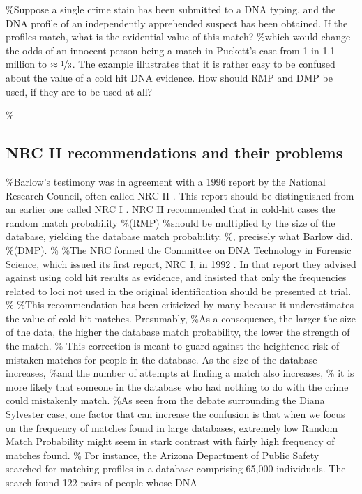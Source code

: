 \documentclass[10pt,dvipsnames,enabledeprecatedfontcommands]{scrartcl}
\begin{document}
\%Suppose a single crime stain has been submitted to a DNA typing, and
the DNA profile of an independently apprehended suspect has been
obtained. If the profiles match, what is the evidential value of this
match? \%which would change the odds of an innocent person being a match
in Puckett's case from 1 in 1.1 million to \(\approx \nicefrac{1}{3}\).
The example illustrates that it is rather easy to be confused about the
value of a cold hit DNA evidence. How should RMP and DMP be used, if
they are to be used at all?

\%\subsection{NRC II recommendations and their problems}

\%Barlow's testimony was in agreement with a 1996 report by the National
Research Council, often called NRC II \citep{NRCII1996}. This report
should be distinguished from an earlier one called NRC I
\citep{NRCI1992}. NRC II recommended that in cold-hit cases the random
match probability \%(RMP) \%should be multiplied by the size of the
database, yielding the database match probability. \%, precisely what
Barlow did. \%(DMP). \% \%The NRC formed the Committee on DNA Technology
in Forensic Science, which issued its first report, NRC I, in 1992 . In
that report they advised against using cold hit results as evidence, and
insisted that only the frequencies related to loci not used in the
original identification should be presented at trial. \% \%This
recommendation has been criticized by many because it underestimates the
value of cold-hit matches. Presumably, \%As a consequence, the larger
the size of the data, the higher the database match probability, the
lower the strength of the match. \% This correction is meant to guard
against the heightened risk of mistaken matches for people in the
database. As the size of the database increases, \%and the number of
attempts at finding a match also increases, \% it is more likely that
someone in the database who had nothing to do with the crime could
mistakenly match. \%As seen from the debate surrounding the Diana
Sylvester case, one factor that can increase the confusion is that when
we focus on the frequency of matches found in large databases, extremely
low Random Match Probability might seem in stark contrast with fairly
high frequency of matches found. \% For instance, the Arizona Department
of Public Safety searched for matching profiles in a database comprising
65,000 individuals. The search found 122 pairs of people whose DNA
\end{document}
